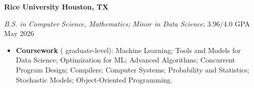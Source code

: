 \textbf{Rice University \hfill Houston, TX} \par
\textit{B.S. in Computer Science, Mathematics; Minor in Data Science}; 3.96/4.0 GPA \hfill May 2026\par
\begin{itemize}
    \item \textbf{Coursework} (\textsuperscript{\textdagger} graduate-level): Machine Learning\textsuperscript{\textdagger}; Tools and Models for Data Science\textsuperscript{\textdagger}; Optimization for ML\textsuperscript{\textdagger}; Advanced Algorithms; Concurrent Program Design; Compilers; Computer Systems; Probability and Statistics; Stochastic Models; Object-Oriented Programming.
\end{itemize}